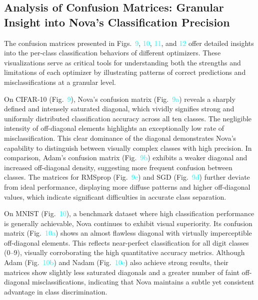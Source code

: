 \documentclass[10pt,twocolumn]{article}
\begin{document}
\subsection{Analysis of Confusion Matrices: Granular Insight into Nova’s Classification Precision}

The confusion matrices presented in Figs.~\textcolor{cyan}{9}, \textcolor{cyan}{10}, \textcolor{cyan}{11}, and \textcolor{cyan}{12} offer detailed insights into the per-class classification behaviors of different optimizers. These visualizations serve as critical tools for understanding both the strengths and limitations of each optimizer by illustrating patterns of correct predictions and misclassifications at a granular level.

On CIFAR-10 (Fig.~\textcolor{cyan}{9}), Nova’s confusion matrix (Fig.~\textcolor{cyan}{9a}) reveals a sharply defined and intensely saturated diagonal, which vividly signifies strong and uniformly distributed classification accuracy across all ten classes. The negligible intensity of off-diagonal elements highlights an exceptionally low rate of misclassification. This clear dominance of the diagonal demonstrates Nova’s capability to distinguish between visually complex classes with high precision. In comparison, Adam’s confusion matrix (Fig.~\textcolor{cyan}{9b}) exhibits a weaker diagonal and increased off-diagonal density, suggesting more frequent confusion between classes. The matrices for RMSprop (Fig.~\textcolor{cyan}{9c}) and SGD (Fig.~\textcolor{cyan}{9d}) further deviate from ideal performance, displaying more diffuse patterns and higher off-diagonal values, which indicate significant difficulties in accurate class separation.

On MNIST (Fig.~\textcolor{cyan}{10}), a benchmark dataset where high classification performance is generally achievable, Nova continues to exhibit visual superiority. Its confusion matrix (Fig.~\textcolor{cyan}{10a}) shows an almost flawless diagonal with virtually imperceptible off-diagonal elements. This reflects near-perfect classification for all digit classes (0–9), visually corroborating the high quantitative accuracy metrics. Although Adam (Fig.~\textcolor{cyan}{10b}) and Nadam (Fig.~\textcolor{cyan}{10e}) also achieve strong results, their matrices show slightly less saturated diagonals and a greater number of faint off-diagonal misclassifications, indicating that Nova maintains a subtle yet consistent advantage in class discrimination.
\end{document}
